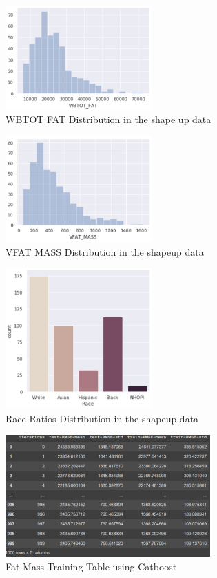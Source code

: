 \begin{figure}[!htb]
        \caption{WBTOT FAT Distribution in the shape up data}
        \centering
        \includegraphics[width=0.5\textwidth]{images/wbtot_fat.png}
\end{figure}


\begin{figure}[!htb]
        \caption{VFAT MASS Distribution in the shapeup data}
        \centering
        \includegraphics[width=0.5\textwidth]{images/vfat_mass.png}
\end{figure}

\begin{figure}[!htb]
        \caption{Race Ratios Distribution in the shapeup data}
        \centering
        \includegraphics[width=0.5\textwidth]{images/race_ratios.png}
\end{figure}
\begin{figure}[!htb]
        \caption{Fat Mass Training Table using Catboost}
        \centering
        \includegraphics[width=0.7\textwidth]{images/catboost_training.png}
\end{figure}

